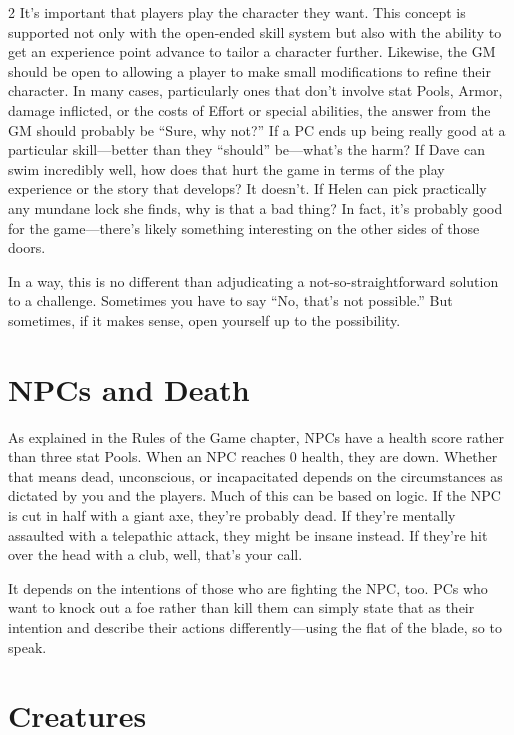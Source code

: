 \begin{multicols}{2}
It’s important that players play the character they want. This concept is supported not only with the open-ended skill system but also with the ability to get an experience point advance to tailor a character further. Likewise, the GM should be open to allowing a player to make small modifications to refine their character. In many cases, particularly ones that don’t involve stat Pools, Armor, damage inflicted, or the costs of Effort or special abilities, the answer from the GM should probably be “Sure, why not?” If a PC ends up being really good at a particular skill—better than they “should” be—what’s the harm? If Dave can swim incredibly well, how does that hurt the game in terms of the play experience or the story that develops? It doesn’t. If Helen can pick practically any mundane lock she finds, why is that a bad thing? In fact, it’s probably good for the game—there’s likely something interesting on the other sides of those doors.

In a way, this is no different than adjudicating a not-so-straightforward solution to a challenge. Sometimes you have to say “No, that’s not possible.” But sometimes, if it makes sense, open yourself up to the possibility.

\chapter{NPCs and Death}

As explained in the Rules of the Game chapter, NPCs have a health score rather than three stat Pools. When an NPC reaches 0 health, they are down. Whether that means dead, unconscious, or incapacitated depends on the circumstances as dictated by you and the players. Much of this can be based on logic. If the NPC is cut in half with a giant axe, they’re probably dead. If they’re mentally assaulted with a telepathic attack, they might be insane instead. If they’re hit over the head with a club, well, that’s your call.

It depends on the intentions of those who are fighting the NPC, too. PCs who want to knock out a foe rather than kill them can simply state that as their intention and describe their actions differently—using the flat of the blade, so to speak.

\chapter{Creatures}


\end{multicols}
